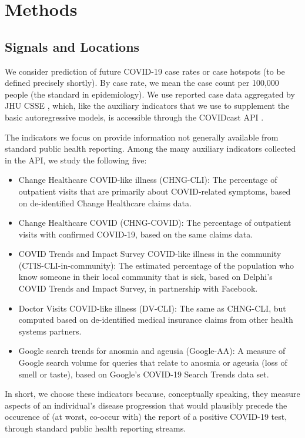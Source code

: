 \documentclass[9pt,twocolumn,twoside,lineno]{pnas-new}
\begin{document}
\section{Methods}

\subsection{Signals and Locations}

We consider prediction of future COVID-19 case rates or case hotspots (to be
defined precisely shortly).  By case rate, we mean the case count per 100,000
people (the standard in epidemiology).  We use reported case data aggregated by 
JHU CSSE \cite{Dong:2020}, which, like the auxiliary indicators that we use to
supplement the basic autoregressive models, is accessible through the COVIDcast
API \cite{CovidcastAPI}. 

The indicators we focus on provide information not generally available from
standard public health reporting. Among the many auxiliary indicators collected
in the API, we study the following five:  
\begin{itemize}
\item Change Healthcare COVID-like illness (CHNG-CLI): The percentage of
  outpatient visits that are primarily about COVID-related symptoms, based on
  de-identified Change Healthcare claims data.
\item Change Healthcare COVID (CHNG-COVID): The percentage of outpatient visits
  with confirmed COVID-19, based on the same claims data.
\item COVID Trends and Impact Survey COVID-like illness in the community
  (CTIS-CLI-in-community): The estimated percentage of the population who know
  someone in their local community that is sick, based on Delphi's COVID Trends
  and Impact Survey, in partnership with Facebook.
\item Doctor Visits COVID-like illness (DV-CLI): The same as CHNG-CLI, but
  computed based on de-identified medical insurance claims from other health
  systems partners.  
\item Google search trends for anosmia and ageusia (Google-AA): A measure of  
  Google search volume for queries that relate to anosmia or ageusia (loss of
  smell or taste), based on Google's COVID-19 Search Trends data set.  
\end{itemize}
In short, we choose these indicators because, conceptually speaking, they
measure aspects of an individual's disease progression that would plausibly
precede the occurence of (at worst, co-occur  with) the report of a positive
COVID-19 test, through standard public health reporting streams.
\end{document}
